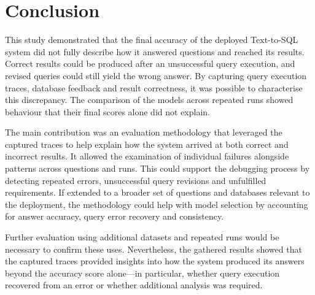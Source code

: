 \section{Conclusion}
\label{sec:conclusion}

This study demonstrated that the final accuracy of the deployed Text-to-SQL system 
did not fully describe how it answered questions and reached its results.
Correct results could be produced after an unsuccessful query execution, 
and revised queries could still yield the wrong answer.
By capturing query execution traces, database feedback and result correctness, 
it was possible to characterise this discrepancy.
The comparison of the models across repeated runs showed 
behaviour that their final scores alone did not explain.

The main contribution was an evaluation methodology that leveraged 
the captured traces to help explain how the system arrived at both correct and incorrect results. 
It allowed the examination of individual failures alongside patterns across questions and runs. 
This could support the debugging process by detecting repeated errors, 
unsuccessful query revisions and unfulfilled requirements. 
If extended to a broader set of questions and databases relevant to the deployment, 
the methodology could help with model selection by accounting for answer accuracy, 
query error recovery and consistency.

Further evaluation using additional datasets and repeated runs would be necessary to confirm these uses. 
Nevertheless, the gathered results showed that the captured traces provided insights into how 
the system produced its answers beyond the accuracy score alone—in particular, 
whether query execution recovered from an error or whether additional analysis was required.